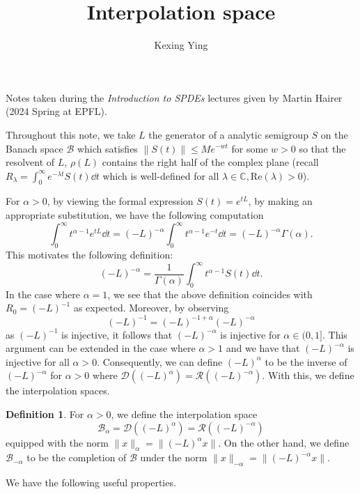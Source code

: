 \documentclass[]{article}
\title{Interpolation space}
\author{Kexing Ying}
\theoremstyle{definition}
\theoremstyle{definition}
\newtheorem*{definition}{Definition}
\begin{document}
\maketitle

Notes taken during the \textit{Introduction to SPDEs} lectures given by Martin Hairer 
(2024 Spring at EPFL).

Throughout this note, we take \(L\) the generator of a analytic semigroup \(S\) on the Banach space \(\mathcal{B}\) which satisfies 
\(\|S(t)\| \le M e^{-w t}\) for some \(w > 0\) so that the resolvent of \(L\), \(\rho(L)\) contains 
the right half of the complex plane (recall \(R_\lambda = \int_0^\infty e^{-\lambda t} S(t) \dd{t}\) 
which is well-defined for all \(\lambda \in \mathbb{C}, \text{Re}(\lambda) > 0\)). 

For \(\alpha > 0\), by viewing the formal expression \(S(t) = e^{tL}\), by making an appropriate substitution, we have 
the following computation
\[\int_0^\infty t^{\alpha - 1} e^{tL} \dd t = (-L)^{-\alpha} \int_0^\infty t^{\alpha - 1} e^{-t} \dd t = (-L)^{-\alpha} \Gamma(\alpha).\]
This motivates the following definition: 
\[(-L)^{-\alpha} = \frac{1}{\Gamma(\alpha)} \int_0^\infty t^{\alpha - 1} S(t) \dd t.\]
In the case where \(\alpha = 1\), we see that the above definition coincides with \(R_0 = (-L)^{-1}\) 
as expected. Moreover, by observing 
\[(-L)^{-1} = (-L)^{-1 + \alpha} (-L)^{-\alpha}\]
as \((-L)^{-1}\) is injective, it follows that \((-L)^{-\alpha}\) is injective for \(\alpha \in (0, 1]\).
This argument can be extended in the case where \(\alpha > 1\) and we have that \((-L)^{-\alpha}\) is
injective for all \(\alpha > 0\). Consequently, we can define \((-L)^\alpha\) to be the 
inverse of \((-L)^{-\alpha}\) for \(\alpha > 0\) where \(\mathcal{D}((-L)^\alpha) = \mathcal{R}((-L)^{-\alpha})\).
With this, we define the interpolation spaces.

\begin{definition}
  For \(\alpha > 0\), we define the interpolation space 
  \[\mathcal{B}_\alpha = \mathcal{D}((-L)^\alpha) = \mathcal{R}((-L)^{-\alpha})\]
  equipped with the norm \(\|x\|_\alpha = \|(-L)^\alpha x\|\). On the other hand, we define \(\mathcal{B}_{-\alpha}\) 
  to be the completion of \(\mathcal{B}\) under the norm \(\|x\|_{-\alpha} = \|(-L)^{-\alpha} x\|\).
\end{definition}

We have the following useful properties.
\end{document}
